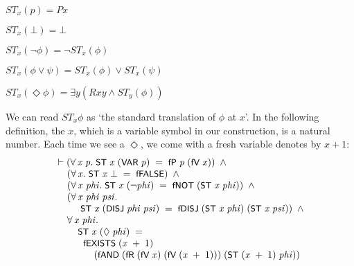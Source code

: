 \documentclass[letterpaper]{article}
\renewcommand{\HOLConst}[1]{{\textsf{\upshape\small #1}}}
\newenvironment{holmath}{\begin{displaymath}\begin{array}{l}}{\end{array}\end{displaymath}\ignorespacesafterend}
\begin{document}
$ST_x(p)= Px$

$ST_x(\bot)=\bot$

$ST_x(\lnot \phi)=\lnot ST_x(\phi)$

$ST_x(\phi\lor \psi) =ST_x(\phi)\lor ST_x(\psi)$

$ST_x(\Diamond\phi)=\exists y(Rxy\land ST_y(\phi))$



We can read $ST_x \phi$ as `the standard translation of $\phi$ at $x$'. In the following definition, the $x$, which is a variable symbol in our construction, is a natural number. Each time we see a $\Diamond$, we come with a fresh variable denotes by $x+1$:
\begin{holmath}
  \ensuremath{\HOLTokenTurnstile}(\HOLSymConst{\HOLTokenForall{}}\HOLBoundVar{x}\;\HOLBoundVar{p}.\;\HOLConst{ST}\;\HOLBoundVar{x}\;(\HOLConst{VAR}\;\HOLBoundVar{p})\;\HOLSymConst{=}\;\HOLConst{fP}\;\HOLBoundVar{p}\;(\HOLConst{fV}\;\HOLBoundVar{x}))\;\HOLSymConst{\HOLTokenConj{}}\\
\;\;\;\;\;(\HOLSymConst{\HOLTokenForall{}}\HOLBoundVar{x}.\;\HOLConst{ST}\;\HOLBoundVar{x}\;\HOLSymConst{\ensuremath{\bot}}\;\HOLSymConst{=}\;\HOLConst{fFALSE})\;\HOLSymConst{\HOLTokenConj{}}\\
\;\;\;\;\;(\HOLSymConst{\HOLTokenForall{}}\HOLBoundVar{x}\;\HOLBoundVar{phi}.\;\HOLConst{ST}\;\HOLBoundVar{x}\;(\HOLSymConst{\HOLTokenNeg{}}\HOLBoundVar{phi})\;\HOLSymConst{=}\;\HOLConst{fNOT}\;(\HOLConst{ST}\;\HOLBoundVar{x}\;\HOLBoundVar{phi}))\;\HOLSymConst{\HOLTokenConj{}}\\
\;\;\;\;\;(\HOLSymConst{\HOLTokenForall{}}\HOLBoundVar{x}\;\HOLBoundVar{phi}\;\HOLBoundVar{psi}.\\
\;\;\;\;\;\;\;\;\;\;\HOLConst{ST}\;\HOLBoundVar{x}\;(\HOLConst{DISJ}\;\HOLBoundVar{phi}\;\HOLBoundVar{psi})\;\HOLSymConst{=}\;\HOLConst{fDISJ}\;(\HOLConst{ST}\;\HOLBoundVar{x}\;\HOLBoundVar{phi})\;(\HOLConst{ST}\;\HOLBoundVar{x}\;\HOLBoundVar{psi}))\;\HOLSymConst{\HOLTokenConj{}}\\
\;\;\;\;\;\HOLSymConst{\HOLTokenForall{}}\HOLBoundVar{x}\;\HOLBoundVar{phi}.\\
\;\;\;\;\;\;\;\;\;\HOLConst{ST}\;\HOLBoundVar{x}\;(\HOLSymConst{\ensuremath{\Diamond}}\;\HOLBoundVar{phi})\;\HOLSymConst{=}\\
\;\;\;\;\;\;\;\;\;\;\;\HOLConst{fEXISTS}\;(\HOLBoundVar{x}\;\HOLSymConst{\ensuremath{+}}\;\HOLNumLit{1})\\
\;\;\;\;\;\;\;\;\;\;\;\;\;\;\;(\HOLConst{fAND}\;(\HOLConst{fR}\;(\HOLConst{fV}\;\HOLBoundVar{x})\;(\HOLConst{fV}\;(\HOLBoundVar{x}\;\HOLSymConst{\ensuremath{+}}\;\HOLNumLit{1})))\;(\HOLConst{ST}\;(\HOLBoundVar{x}\;\HOLSymConst{\ensuremath{+}}\;\HOLNumLit{1})\;\HOLBoundVar{phi}))
\end{holmath}
\end{document}
